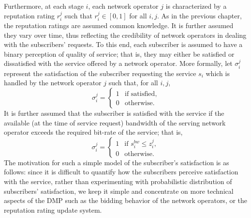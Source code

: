 Furthermore, at each stage $i$, each network operator $j$ is characterized by a reputation rating $r^j_i$ such that $r^j_i\in[0,1]$ for all $i,j$. As in the previous chapter, the reputation ratings are assumed common knowledge. It is further assumed they vary over time, thus reflecting the credibility of network operators in dealing with the subscribers' requests. To this end, each subscriber is assumed to have a binary perception of quality of service; that is, they may either be satisfied or dissatisfied with the service offered by a network operator. More formally, let $\sigma^j_i$ represent the satisfaction of the subscriber requesting the service $s_i$ which is handled by the network operator $j$ such that, for all $i,j$,
\begin{equation}
  \label{eq:def_users_satisfaction_dynamic}
  \sigma^j_i = \left\{
  \begin{array}{ll}
    1 &\text{if satisfied},\\
    0 &\text{otherwise}.
  \end{array}\right.
\end{equation}
It is further assumed that the subscriber is satisfied with the service if the available (at the time of service request) bandwidth of the serving network operator exceeds the required bit-rate of the service; that is,
\begin{equation}
  \label{eq:def_users_satisfaction_bandwidth_dynamic}
  \sigma^j_i = \left\{
  \begin{array}{ll}
    1 &\text{if } s_i^{bw} \le z_i^j,\\
    0 &\text{otherwise}.
  \end{array}\right.
\end{equation}
The motivation for such a simple model of the subscriber's satisfaction is as follows: since it is difficult to quantify how the subscribers perceive satisfaction with the service, rather than experimenting with probabilistic distribution of subscribers' satisfaction, we keep it simple and concentrate on more technical aspects of the DMP such as the bidding behavior of the network operators, or the reputation rating update system.

